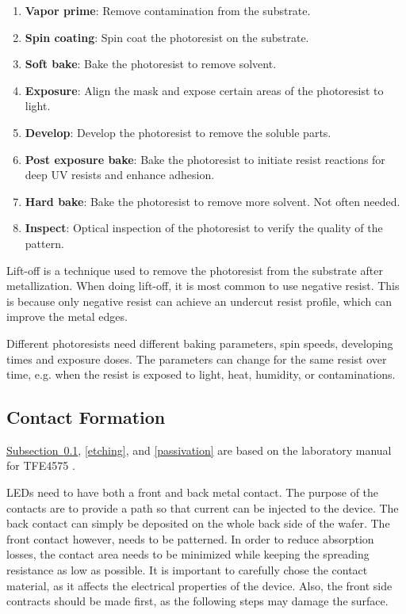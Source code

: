 
\begin{enumerate}
    \item \textbf{Vapor prime}: Remove contamination from the substrate.
    \item \textbf{Spin coating}: Spin coat the photoresist on the substrate.
    \item \textbf{Soft bake}: Bake the photoresist to remove solvent.
    \item \textbf{Exposure}: Align the mask and expose certain areas of the photoresist to light.
    \item \textbf{Develop}: Develop the photoresist to remove the soluble parts.
    \item \textbf{Post exposure bake}: Bake the photoresist to initiate resist reactions for deep UV resists and enhance adhesion. 
    \item \textbf{Hard bake}: Bake the photoresist to remove more solvent. Not often needed.
    \item \textbf{Inspect}: Optical inspection of the photoresist to verify the quality of the pattern.
\end{enumerate} 

Lift-off is a technique used to remove the photoresist from the substrate after metallization.
When doing lift-off, it is most common to use negative resist. 
This is because only negative resist can achieve an undercut resist profile, which can improve the metal edges.

Different photoresists need different baking parameters, spin speeds, developing times and exposure doses.
The parameters can change for the same resist over time, e.g. when the resist is exposed to light, heat, humidity, or contaminations.

\subsection{Contact Formation} \label{contactformation}


\hyperref[contactformation]{Subsection~\ref*{contactformation}}, \autoref{etching}, and \autoref{passivation} are based on the laboratory manual for TFE4575 \cite{labmanual}.

LEDs need to have both a front and back metal contact.
The purpose of the contacts are to provide a path so that  current can be injected to the device. 
The back contact can simply be deposited on the whole back side of the wafer.
The front contact however, needs to be patterned.
In order to reduce absorption losses, the contact area needs to be minimized while keeping the spreading resistance as low as possible.
It is important to carefully chose the contact material, as it affects the electrical properties of the device.
Also, the front side contracts should be made first, as the following steps may damage the surface.

